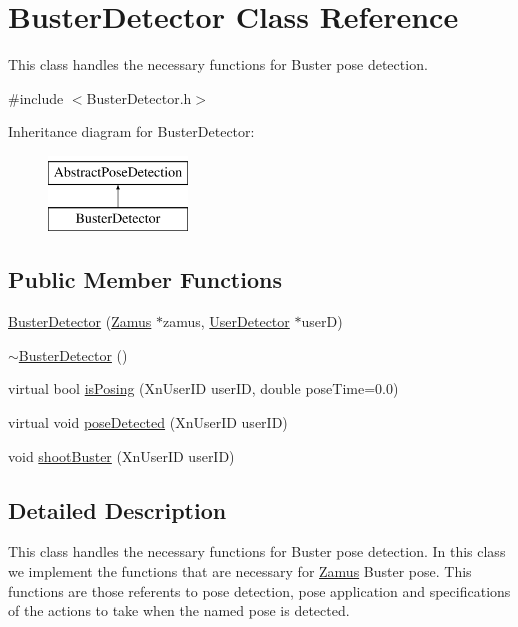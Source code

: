\hypertarget{classBusterDetector}{
\section{BusterDetector Class Reference}
\label{classBusterDetector}
}


This class handles the necessary functions for Buster pose detection.  




{\ttfamily \#include $<$BusterDetector.h$>$}

Inheritance diagram for BusterDetector:\begin{figure}[H]
\begin{center}
\leavevmode
\includegraphics[height=2cm]{classBusterDetector}
\end{center}
\end{figure}
\subsection*{Public Member Functions}
\begin{DoxyCompactItemize}
\item 
\hyperlink{classBusterDetector_a9c2ad0b8a83b03fe55ab373fe63a2bf3}{BusterDetector} (\hyperlink{classZamus}{Zamus} $\ast$zamus, \hyperlink{classUserDetector}{UserDetector} $\ast$userD)
\item 
\hyperlink{classBusterDetector_a42cf936b77e8e2cd41e341ed2dbf2773}{$\sim$BusterDetector} ()
\item 
virtual bool \hyperlink{classBusterDetector_aa5b294c25df6ace744af596bd708c31c}{isPosing} (XnUserID userID, double poseTime=0.0)
\item 
virtual void \hyperlink{classBusterDetector_ac91be6357453deb9e15b3297b6299be3}{poseDetected} (XnUserID userID)
\item 
void \hyperlink{classBusterDetector_a220cb00cf59b19e778771c4638c7e572}{shootBuster} (XnUserID userID)
\end{DoxyCompactItemize}


\subsection{Detailed Description}
This class handles the necessary functions for Buster pose detection. In this class we implement the functions that are necessary for \hyperlink{classZamus}{Zamus} Buster pose. This functions are those referents to pose detection, pose application and specifications of the actions to take when the named pose is detected.


